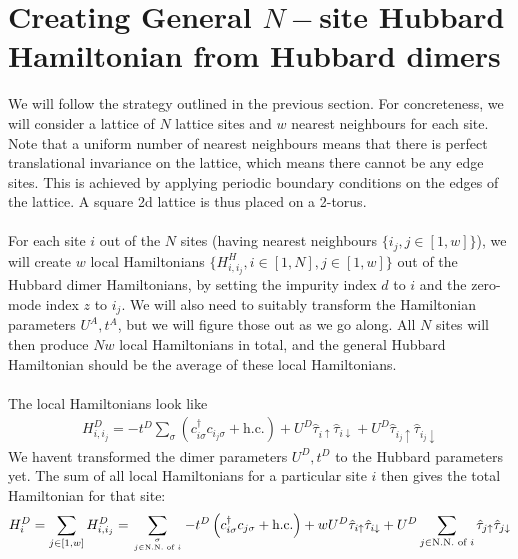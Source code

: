 \documentclass[12pt]{article}
\numberwithin{equation}{section}
\begin{document}
\section{Creating General \(N-\)site Hubbard Hamiltonian from Hubbard dimers}
We will follow the strategy outlined in the previous section. For concreteness, we will consider a lattice of \(N\) lattice sites and \(w\) nearest neighbours for each site. Note that a uniform number of nearest neighbours means that there is perfect translational invariance on the lattice, which means there cannot be any edge sites. This is achieved by applying periodic boundary conditions on the edges of the lattice. A square 2d lattice is thus placed on a 2-torus.
\\\\
For each site \(i\) out of the \(N\) sites (having nearest neighbours \(\{i_j, j\in\left[1,w\right]\}\)), we will create \(w\) local Hamiltonians \(\{H^H_{i,i_j}, i\in \left[1,N\right], j \in \left[1,w\right]  \}\) out of the Hubbard dimer Hamiltonians, by setting the impurity index \(d\) to \(i\) and the zero-mode index \(z\) to \(i_j\). We will also need to suitably transform the Hamiltonian parameters \(U^A, t^A\), but we will figure those out as we go along. All \(N\) sites will then produce \(Nw\) local Hamiltonians in total, and the general Hubbard Hamiltonian should be the average of these local Hamiltonians. 
\\\\
The local Hamiltonians look like
\begin{equation}\begin{aligned}
	H^D_{i,i_j} = -t^D\sum_{\sigma}\left(c^\dagger_{i\sigma}c_{i_j\sigma} + \text{h.c.}\right) + U^D\hat \tau_{i \uparrow}\hat \tau_{i \downarrow} + U^D\hat \tau_{i_j \uparrow}\hat \tau_{i_j \downarrow}
\end{aligned}\end{equation}
We havent transformed the dimer parameters \(U^D, t^D\) to the Hubbard parameters yet. The sum of all local Hamiltonians for a particular site \(i\) then gives the total Hamiltonian for that site:
\begin{equation}\begin{aligned}
	H^D_{i} = \sum_{j\in\left[1,w\right]}H^D_{i,i_j} = \sum_{\sigma\atop{j \in \text{N.N. of }i}}-t^D\left(c^\dagger_{i\sigma}c_{j\sigma} + \text{h.c.}\right) + w U^D\hat \tau_{i \uparrow}\hat \tau_{i \downarrow} + U^D\sum_{j \in \text{N.N. of }i}\hat \tau_{j \uparrow}\hat \tau_{j \downarrow}
\end{aligned}\end{equation}
\end{document}
